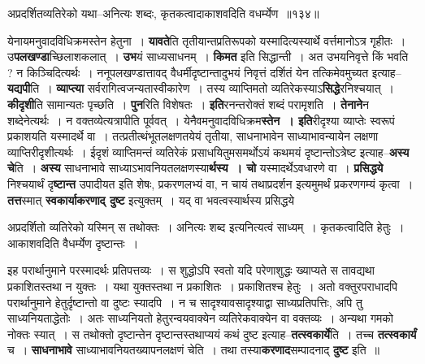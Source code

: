 \documentclass[article,12pt,a4paper]{memoir}
\begin{document}
	  \bigskip
	  \begingroup
	

	  \pstart अप्रदर्शितव्यतिरेको यथा--अनित्यः शब्दः, कृतकत्वादाकाशवदिति वधर्म्येण ॥१३४॥
	\pend
      
	  \endgroup
	
	  \endgroup
	

	  \pstart येनायमनुवादविधिक्रमस्तेन हेतुना । \textbf{यावते}ति तृतीयान्तप्रतिरूपको यस्मादित्यस्यार्थे वर्त्तमानोऽत्र गृहीतः । उ\leavevmode{}\textbf{पलखण्डा}च्छिलाशकलात् । \textbf{उभ}यं साध्यसाधनम् । \textbf{किमत} इति सिद्धान्ती । अत उभयनिवृत्ते किं भवति ? न किञ्चिदित्यर्थः । ननूपलखण्डात्तावद् वैधर्मीदृष्टान्तादुभयं निवृत्तं दर्शितं येन तत्किमेवमुच्यत इत्याह--\textbf{यद्यपी}ति । \textbf{व्याप्त्या} सर्वरागित्वजन्यतास्वीकारेण । तस्य व्याप्तिमतो व्यतिरेकस्याऽ\textbf{सिद्धे}रनिश्चयात् । \textbf{कीदृशी}ति सामान्यतः पृच्छति । \textbf{पुन}रिति विशेषतः । \textbf{इति}रनन्तरोक्तं शब्दं परामृशति । \textbf{तेनाने}न शब्देनेत्यर्थः । न वक्तव्येत्यत्रापीति पूर्ववत् । येनैवमनुवादविधिक्रम\textbf{स्तेन । इति}रीदृश्या व्याप्तेः स्वरूपं प्रकाशयति यस्मादर्थे वा । तत्प्रतीत्थंभूतलक्षणतयेयं तृतीया, साधनाभावेन साध्याभावन्यायेन लक्षणा व्याप्तिरीदृशीत्यर्थः । ईदृशं व्याप्तिमन्तं व्यतिरेकं प्रसाधयितुमसमर्थोऽयं कथमयं दृष्टान्तोऽत्रेष्ट इत्याह--\textbf{अस्य चे}ति । \textbf{अस्य} साधनाभावे साध्याऽभावनियतलक्षणस्या\textbf{र्थस्य । चो} यस्मादर्थेऽवधारणे वा । \textbf{प्रसिद्धये} निश्चयार्थं दृ\textbf{ष्टान्त} उपादीयत इति शेषः, प्रकरणलभ्यं वा, न चायं तथाप्रदर्शन इत्यमुमर्थं प्रकरणगम्यं कृत्वा । \textbf{तत्त}स्मात् \textbf{स्वकार्याकरणाद् दुष्ट} इत्युक्तम् । यद् वा भवत्वस्यार्थस्य प्रसिद्धये          \leavevmode{} 
	  
	अप्रदर्शितो व्यतिरेको यस्मिन् स तथोक्तः । अनित्यः शब्द इत्यनित्यत्वं साध्यम् । कृतकत्वादिति हेतुः । आकाशवदिति वैधर्म्येण दृष्टान्तः ।  
	  
	इह परार्थानुमाने परस्मादर्थः प्रतिपत्तव्यः । स शुद्धोऽपि स्वतो यदि परेणाशुद्धः ख्याप्यते स तावद्यथा प्रकाशितस्तथा न युक्तः । यथा युक्तस्तथा न प्रकाशितः । प्रकाशितश्च हेतुः । अतो वक्तुरपराधादपि परार्थानुमाने हेतुर्दृष्टान्तो वा दुष्टः स्यादपि । न च सादृश्यावसादृश्याद्वा साध्यप्रतिपत्तिः, अपि तु साध्यनियताद्धेतोः । अतः साध्यनियतो हेतुरन्वयवाक्येन व्यतिरेकवाक्येन वा वक्तव्यः । अन्यथा गमको नोक्तः स्यात् । स तथोक्तो दृष्टान्तेन दृष्टान्तस्तथाप्ययं कथं दुष्ट इत्याह--\textbf{तत्स्वकार्ये}ति । तच्च \textbf{तत्स्वकार्यं} च । \textbf{साधनाभावे} साध्याभावनियतख्यापनलक्षणं चेति । तथा तस्या\textbf{करणाद}सम्पादनाद् \textbf{दुष्ट} इति ॥
	\pend
      
\end{document}
